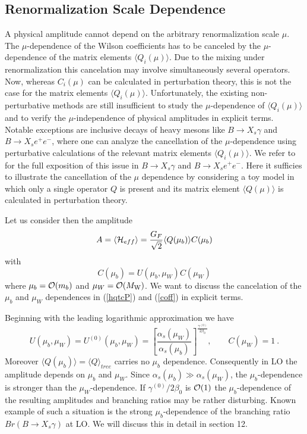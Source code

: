 \documentclass[12pt,rotate]{article}
\def\as{\alpha_s}
\newcommand{\mw}{M_{\rm W}}
\newcommand{\be}{\begin{equation}}
\newcommand{\ee}{\end{equation}}
\newcommand{\ord}{{\cal O}}
\begin{document}
\begin{itemize}
\begin{itemize}
\subsection{Renormalization Scale Dependence}
A physical amplitude cannot depend on the arbitrary renormalization
scale $\mu$. The $\mu$-dependence of the Wilson coefficients has to
be canceled by the $\mu$-dependence of the matrix elements
$\langle Q_i(\mu)\rangle$. Due to the mixing under renormalization
this cancelation may involve simultaneously several operators.
Now, whereas $C_i(\mu)$ can be calculated in perturbation theory,
this is not the case for the matrix elements $\langle Q_i(\mu)\rangle$.
Unfortunately, the existing non-perturbative methods are still
insufficient to study the $\mu$-dependence of $\langle Q_i(\mu)\rangle$
and to verify the $\mu$-independence of physical amplitudes in explicit
terms. Notable exceptions are inclusive decays of heavy mesons
like $B\to X_s \gamma$ and $B \to X_s e^+e^-$, where one can analyze
the cancellation of the $\mu$-dependence using perturbative calculations
of the relevant matrix elements $\langle Q_i(\mu)\rangle$. We refer
to \cite{BuMu:94,BKP1} for the full exposition of this issue in
$B\to X_s \gamma$ and $B \to X_s e^+e^-$. Here it sufficies to illustrate
the cancellation of the $\mu$ dependence by considering a toy model
in which only a single operator $Q$ is present and its matrix element
$\langle Q(\mu)\rangle$ is calculated in perturbation theory.

Let us consider then the amplitude
\begin{equation}\label{hqtcP}
A=\langle {\cal H}_{eff}\rangle=
{G_F\over\sqrt{2}}
  \langle Q(\mu_b)\rangle C(\mu_b)   
\end{equation}
with
\be\label{coff}
C(\mu_b)=U(\mu_b,\mu_W) C(\mu_W)
\ee
where $\mu_b=\ord(m_b)$ and $\mu_W=\ord(\mw)$.
We want to discuss the cancelation of the $\mu_b$ and $\mu_W$ dependences
in (\ref{hqtcP}) and (\ref{coff}) in explicit terms.

Beginning with the leading logarithmic approximation we have
\begin{equation}\label{B9PP0}
U(\mu_b,\mu_W)=  U^{(0)}(\mu_b,\mu_W) =
\left[\frac{\as(\mu_W)}{\as(\mu_b)}\right]^{\frac{\gamma^{(0)}}{2\beta_0}}, 
\qquad C(\mu_W)=1~.
\end{equation}
Moreover $ \langle Q(\mu_b)\rangle=\langle Q \rangle_{tree} $ carries no
$\mu_b$ dependence.
Consequently in LO the amplitude depends on $\mu_b$ and $\mu_W$.
Since $\as(\mu_b)\gg\as(\mu_W)$, the $\mu_b$-dependence is stronger
than the $\mu_W$-dependence. 
If $\gamma^{(0)}/2\beta_0$ is $\ord(1)$
the $\mu_b$-dependence of the resulting amplitudes and branching ratios 
may be rather
disturbing. Known example of such a situation is the strong 
$\mu_b$-dependence
of the branching ratio $Br(B\to X_s\gamma)$ at LO.
We will discuss this in detail in section 12.


\end{itemize}
\end{itemize}
\end{document}
